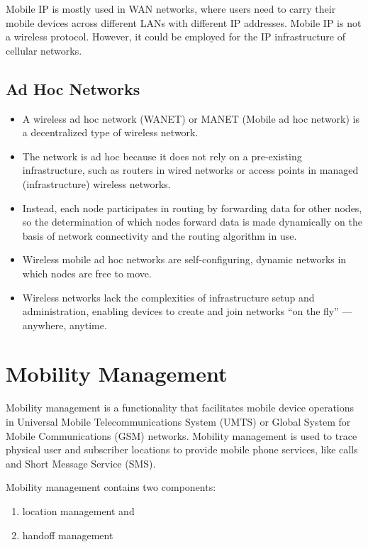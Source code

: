 Mobile IP is mostly used in WAN networks, where users need to carry their mobile devices
across different LANs with different IP addresses. Mobile IP is not a wireless protocol.
However, it could be employed for the IP infrastructure of cellular networks.


\subsection*{Ad Hoc Networks}
\begin{itemize}
	\item A wireless ad hoc network (WANET) or MANET (Mobile ad hoc network) is a decentralized type of wireless network. 
	\item The network is ad hoc because it does not rely on	a pre-existing infrastructure, such as routers in wired networks or access points in managed (infrastructure) wireless networks. 
	\item Instead, each node participates in routing by	forwarding data for other nodes, so the determination of which nodes forward data is made dynamically on the basis of network connectivity and the routing algorithm in use. 
	\item Wireless mobile ad hoc networks are self-configuring, dynamic networks in which nodes are free to	move. 
	\item Wireless networks lack the complexities of infrastructure setup and administration, enabling devices to create and join networks ``on the fly” — anywhere, anytime.
\end{itemize}


\section{Mobility Management}
Mobility management is a functionality that facilitates mobile device operations in Universal Mobile Telecommunications System (UMTS) or Global System for Mobile Communications
(GSM) networks. Mobility management is used to trace physical user and subscriber locations to provide mobile phone services, like calls and Short Message Service (SMS).\par 


Mobility management contains two components: 
\begin{enumerate}
	\item location management and 
	\item handoff management
\end{enumerate}

